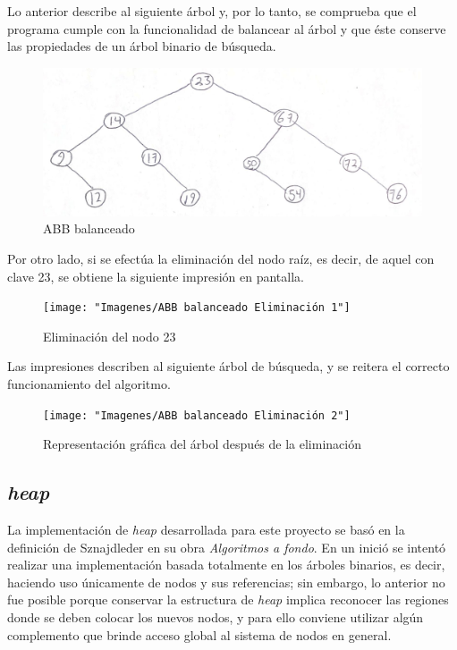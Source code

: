 \documentclass[letterpaper, 11pt]{article}
\begin{document}
	Lo anterior describe al siguiente árbol y, por lo tanto, se comprueba que el programa cumple con la funcionalidad de balancear al árbol y que éste conserve las propiedades de un árbol binario de búsqueda.
	
	\begin{figure}[H]
		\centering
		\includegraphics[scale=0.3]{"Imagenes/ABB balanceado 2"}
		\caption{ABB balanceado}
	\end{figure}
	
	Por otro lado, si se efectúa la eliminación del nodo raíz, es decir, de aquel con clave 23, se obtiene la siguiente impresión en pantalla.
	
	\begin{figure}[H]
		\centering
		\texttt{[image: "Imagenes/ABB balanceado Eliminación 1"]}
		\caption{Eliminación del nodo 23}
	\end{figure}
	
	Las impresiones describen al siguiente árbol de búsqueda, y se reitera el correcto funcionamiento del algoritmo.
	
	\begin{figure}[H]
		\centering
		\texttt{[image: "Imagenes/ABB balanceado Eliminación 2"]}
		\caption{Representación gráfica del árbol después de la eliminación}
	\end{figure}
	
	\subsection*{\textit{heap}}
	
	La implementación de \textit{heap} desarrollada para este proyecto se basó en la definición de Sznajdleder en su obra \textit{Algoritmos a fondo}. En un inició se intentó realizar una implementación basada totalmente en los árboles binarios, es decir, haciendo uso únicamente de nodos y sus referencias; sin embargo, lo anterior no fue posible porque conservar la estructura de \textit{heap} implica reconocer las regiones donde se deben colocar los nuevos nodos, y para ello conviene utilizar algún complemento que brinde acceso global al sistema de nodos en general. 
	
\end{document}
